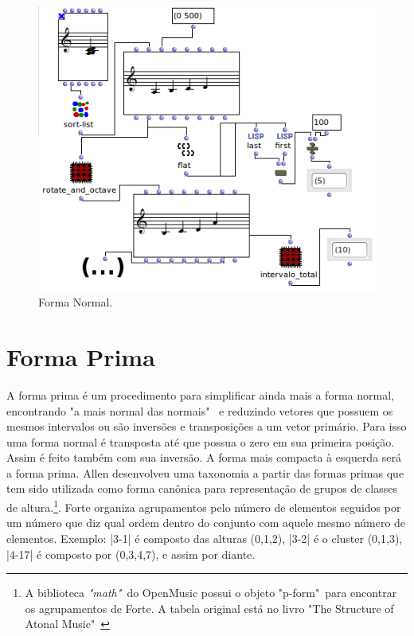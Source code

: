 \documentclass[
	12pt,				%
	openright,			%
	twoside,			%
	a4paper,			%
	english,			%
	french,				%
	spanish,			%
	brazil				%
	]{abntex2}
\begin{document}
\begin{apendicesenv}
\begin{figure}[h]
	\caption{\label{fig_grafico}Forma Normal. }
	\begin{center}
	    \includegraphics[scale=0.7]{OM_settheory/forma_normal.png}
	\end{center}
\end{figure}



\pagebreak
\section{Forma Prima} 

A forma prima é um procedimento para simplificar ainda mais a forma normal, encontrando "a mais normal das normais"\ \cite[p. 47]{straus2004} e reduzindo vetores que possuem os mesmos intervalos ou são inversões e transposições a um vetor primário. Para isso uma forma normal é transposta até que possua o zero em sua primeira posição. Assim é feito também com sua inversão. A forma mais compacta à esquerda será a forma prima. Allen  desenvolveu uma taxonomia a partir das formas primas que tem sido utilizada como forma canônica para representação de grupos de classes de altura.\footnote{A biblioteca \textit{"math"}\ do OpenMusic possui o objeto "p-form"\ para encontrar os agrupamentos de Forte. A tabela original está no livro "The Structure of Atonal Music"\ \cite[p.179-181]{forte1973structure}}. Forte organiza agrupamentos pelo número de elementos seguidos por um número que diz qual ordem dentro do conjunto com aquele mesmo número de elementos. Exemplo: |3-1| é composto das alturas (0,1,2), |3-2|  é o cluster (0,1,3), |4-17|  é composto por (0,3,4,7), e assim por diante.


\end{apendicesenv}
\end{document}
